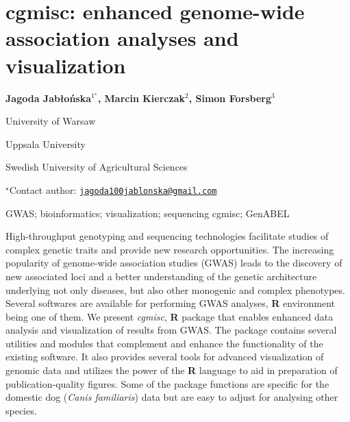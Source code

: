 \documentclass[\main/boa.tex]{subfiles}
\begin{document}
\section{cgmisc: enhanced genome-wide association analyses and visualization}

\begin{center}
  {\bf {} Jagoda Jabłońska$^{1^\star}$,  Marcin Kierczak$^{2}$,  Simon Forsberg$^{3}$}
\end{center}

\vskip 0.3cm

\begin{affiliations}
\begin{enumerate}
\begin{minipage}{0.915\textwidth}
\centering
\item University of Warsaw \\[-2pt]
\item Uppsala University \\[-2pt]
\item Swedish University of Agricultural Sciences \\[-2pt]
\end{minipage}
\end{enumerate}
$^\star$Contact author: \href{mailto:jagoda100jablonska@gmail.com}{\nolinkurl{jagoda100jablonska@gmail.com}}\\
\end{affiliations}

\vskip 0.5cm

\begin{minipage}{0.915\textwidth}
\keywords GWAS; bioinformatics; visualization; sequencing
\packages {} cgmisc;  GenABEL
\end{minipage}

\vskip 0.8cm

High-throughput genotyping and sequencing technologies facilitate
studies of complex genetic traits and provide new research
opportunities. The increasing popularity of genome-wide association
studies (GWAS) leads to the discovery of new associated loci and a
better understanding of the genetic architecture underlying not only
diseases, but also other monogenic and complex phenotypes. Several
softwares are available for performing GWAS analyses, \textbf{R}
environment being one of them. We present \emph{cgmisc}, \textbf{R}
package that enables enhanced data analysis and visualization of results
from GWAS. The package contains several utilities and modules that
complement and enhance the functionality of the existing software. It
also provides several tools for advanced visualization of genomic data
and utilizes the power of the \textbf{R} language to aid in preparation
of publication-quality figures. Some of the package functions are
specific for the domestic dog (\emph{Canis familiaris}) data but are
easy to adjust for analysing other species.
\end{document}
